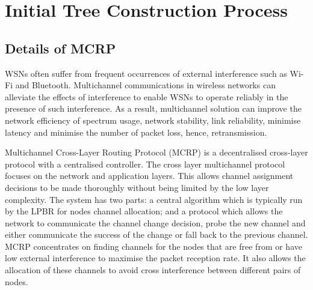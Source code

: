 \section{Initial Tree Construction Process}
\label{MCRP}
\subsection{Details of MCRP}

WSNs often suffer from frequent occurrences of external interference such as Wi-Fi and Bluetooth.
Multichannel communications in wireless networks can alleviate the effects of interference to enable WSNs to operate reliably in the presence of such interference. As a result, multichannel solution can improve the network efficiency of spectrum usage, network stability, link reliability, minimise latency and minimise the number of packet loss, hence, retransmission.

Multichannel Cross-Layer Routing Protocol (MCRP) \cite{mcrp} is a decentralised cross-layer protocol with a centralised controller. The cross layer multichannel protocol focuses on the network and application layers. This allows channel assignment decisions to be made thoroughly without being limited by the low layer complexity. The system has two parts: a central algorithm which is typically run by the LPBR for nodes channel allocation; and a protocol which allows the network to communicate the channel change decision, probe the new channel and either communicate the success of the change or fall back to the previous channel. MCRP concentrates on finding channels for the nodes that are free from or have low external interference to maximise the packet reception rate. It also allows the allocation of these channels to avoid cross interference between different pairs of nodes.


